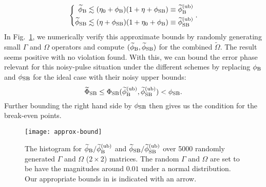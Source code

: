 \documentclass[b5paper,11pt]{article}
\newcommand{\wtO}{\widetilde{\Omega}}
\begin{document}
\begin{equation}\label{eq:comb-bound}
\left\{
\begin{aligned}
 \widetilde\phi_{\mathrm{B}} &\lesssim (\eta_0 + \phi_{\mathrm{B}})(1+\eta + \phi_{\mathrm{SB}}) \equiv \widetilde\phi_{\mathrm{B}}^{(\mathrm{ub})}\\
 \widetilde\phi_{\mathrm{SB}} &\lesssim (\eta + \phi_{\mathrm{SB}}) (1+\eta_0 + \phi_{\mathrm{B}})\equiv \widetilde\phi_{\mathrm{SB}}^{(\mathrm{ub})}
\end{aligned}
\right..
\end{equation}
In Fig.~\ref{fig:approx-bound}, we numerically verify this approximate bounds by randomly generating small $\Gamma$ and $\Omega$ operators and compute $(\widetilde\phi_{\mathrm{B}},\widetilde{\phi}_{\mathrm{SB}})$ for the combined $\wtO$.
The result seems positive with no violation found.
With this, we can bound the error phase relevant for this noisy-pulse situation under the different schemes by replacing $\phi_{\mathrm{B}}$ and $\phi_{\mathrm{SB}}$ for the ideal case with their noisy upper bounds: 
\begin{equation}
 \widetilde\Phi_{\mathrm{SB}} \le \Phi_{\mathrm{SB}}(\widetilde\phi_{\mathrm{B}}^{(\mathrm{ub})}  ,\widetilde\phi_{\mathrm{SB}}^{(\mathrm{ub})} ) < \phi_{\mathrm{SB}}.
\end{equation}
Further bounding the right hand side by $\phi_{\mathrm{SB}}$ then gives us the condition for the break-even points.

\begin{figure}[htbp]
 \centering
 \texttt{[image: approx-bound]}
 \caption{The histogram for $\widetilde\phi_{\mathrm{B}}/\widetilde\phi_{\mathrm{B}}^{(\mathrm{ub})}$ and $\widetilde\phi_{\mathrm{SB}}/\widetilde\phi_{\mathrm{SB}}^{(\mathrm{ub})}$ over 5000 randomly generated $\Gamma$ and $\Omega$ ($2\times2$) matrices. The random $\Gamma$ and $\Omega$ are set to be have the magnitudes around $0.01$ under a normal distribution. Our appropriate bounds in  is indicated with an arrow.}
 \label{fig:approx-bound}
\end{figure}
\end{document}
